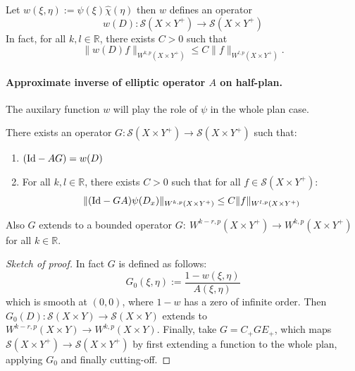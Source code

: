 Let \(w(\xi,\eta):=\psi(\xi)\hat\chi(\eta)\) then \(w\) defines an operator
\[
 w(D): \mathcal{S}(X\times Y^+) \longrightarrow \mathcal{S}(X\times Y^+)
\]
In fact, for all \(k,l\in \mathbb{R}\), there exists \(C>0\) such that
\[
 \|w(D)f\|_{W^{k,p}(X\times Y^+)} \leq C \|f\|_{W^{l,p}(X\times Y^+)}.
\]

\iffalse

\begin{remark}
\label{rem:hamilton-sign-issue}
I changed the definition of \(\chi\) in \cite{hamilton_harmonic_1975},
where originally \(\chi(y):=\varphi(y-1)\) and should maps \(\mathcal{S}(Y^+/0)\) to
itself, not \(\mathcal{S}(Y^-/0)\) to itself as we wish.
\end{remark}
\fi


\paragraph{Approximate inverse of elliptic operator \(A\) on half-plan.}
\label{sec:org9757bc8}
The auxilary function \(w\) will play the role of \(\psi\) in the whole plan case.

\begin{theorem}
\label{thm:approx-inv-A}
There exists an operator \(G: \mathcal{S}(X\times Y^+) \longrightarrow
\mathcal{S}(X\times Y^+)\) such that:
\begin{enumerate}
\item \(({\rm Id} - AG) = w(D)\)
\item For all \(k,l\in \mathbb{R}\), there exists \(C>0\) such that for all \(f\in
   \mathcal{S}(X\times Y^+)\):
\[
    \|({\rm Id} - GA)\psi(D_x)\|_{W^{k,p}(X\times Y^+)}\leq C \|f\|_{W^{l,p}(X\times Y^+)}
   \]
\end{enumerate}
Also \(G\) extends to a bounded operator \(G:\ W^{k-r,p}(X\times Y^+) \longrightarrow
W^{k,p}(X\times Y^+)\) for all \(k\in \mathbb{R}\).
\end{theorem}

\begin{proof}[Sketch of proof]
In fact \(G\) is defined as follows:
\[
 G_0(\xi,\eta):= \frac{1-w(\xi,\eta)}{A(\xi,\eta)}
\]
which is smooth at \((0,0)\), where \(1- w\) has a zero of infinite order. Then \(G_0(D): \mathcal{S}(X\times Y) \longrightarrow \mathcal{S}(X\times Y)\) extends to \(W^{k-r,p}(X\times Y) \longrightarrow W^{k,p}(X\times Y)\). Finally, take \(G=C_+ G E_+\), which maps \(\mathcal{S}(X\times Y^+) \longrightarrow \mathcal{S}(X\times Y^+)\) by
first extending a function to the whole plan, applying \(G_0\) and finally cutting-off.
\end{proof}


